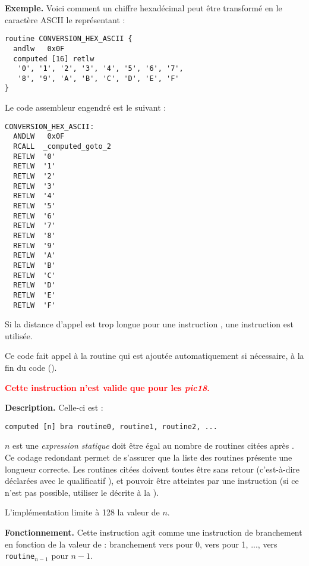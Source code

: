 \textbf{Exemple.} Voici comment un chiffre hexadécimal peut être transformé en le caractère ASCII le représentant :
\begin{lstlisting}[language=piccolo]
routine CONVERSION_HEX_ASCII {
  andlw   0x0F
  computed [16] retlw
   '0', '1', '2', '3', '4', '5', '6', '7',
   '8', '9', 'A', 'B', 'C', 'D', 'E', 'F'
}
\end{lstlisting}

Le code assembleur engendré est le suivant :
\begin{lstlisting}[language=assembleur]
CONVERSION_HEX_ASCII:
  ANDLW   0x0F
  RCALL  _computed_goto_2
  RETLW  '0'
  RETLW  '1'
  RETLW  '2'
  RETLW  '3'
  RETLW  '4'
  RETLW  '5'
  RETLW  '6'
  RETLW  '7'
  RETLW  '8'
  RETLW  '9'
  RETLW  'A'
  RETLW  'B'
  RETLW  'C'
  RETLW  'D'
  RETLW  'E'
  RETLW  'F'
\end{lstlisting}

Si la distance d'appel est trop longue pour une instruction , une instruction  est utilisée.

Ce code fait appel à la routine  qui est ajoutée automatiquement si nécessaire, à la fin du code (). 


\textcolor{red}{\bf Cette instruction n'est valide que pour les \emph{pic18}.}

\textbf{Description.} Celle-ci est :
\begin{lstlisting}[language=piccolo]
computed [n] bra routine0, routine1, routine2, ...
\end{lstlisting}

$n$ est une \emph{expression statique} doit être égal au nombre de routines citées après . Ce codage redondant permet de s'assurer que la liste des routines présente une longueur correcte. Les routines citées doivent toutes être sans retour (c'est-à-dire déclarées avec le qualificatif ), et pouvoir être atteintes par une instruction  (si ce n'est pas possible, utiliser le  décrite à la ).

L'implémentation limite à 128 la valeur de $n$.

\textbf{Fonctionnement.} Cette instruction agit comme une instruction de branchement en fonction de la valeur de  : branchement vers  pour 0, vers  pour 1, ..., vers \texttt{routine}$_{n-1}$ pour $n-1$. 

